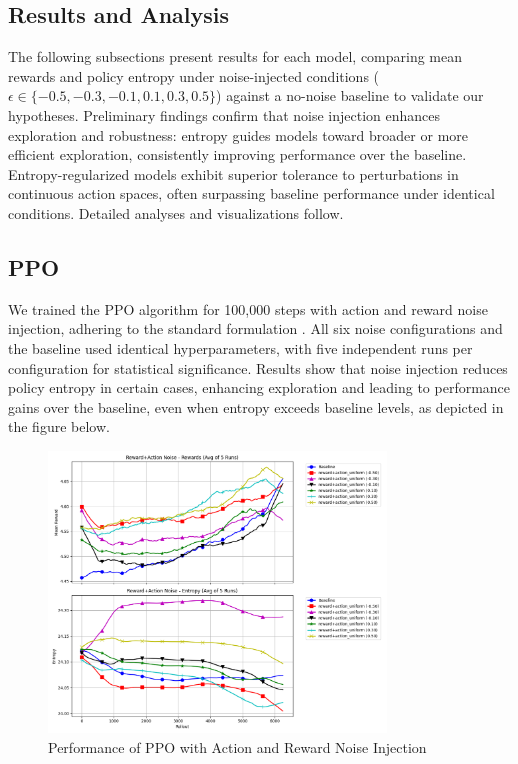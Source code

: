 \documentclass{svproc}
\begin{document}

\subsection{Results and Analysis}

The following subsections present results for each model, comparing mean rewards and policy entropy under noise-injected conditions (\(\epsilon \in \{-0.5, -0.3, -0.1, 0.1, 0.3, 0.5\}\)) against a no-noise baseline to validate our hypotheses. Preliminary findings confirm that noise injection enhances exploration and robustness: entropy guides models toward broader or more efficient exploration, consistently improving performance over the baseline. Entropy-regularized models exhibit superior tolerance to perturbations in continuous action spaces, often surpassing baseline performance under identical conditions. Detailed analyses and visualizations follow.

\subsection{PPO}

We trained the PPO algorithm for 100,000 steps with action and reward noise injection, adhering to the standard formulation \cite{schulman2017proximalpolicyoptimizationalgorithms}. All six noise configurations and the baseline used identical hyperparameters, with five independent runs per configuration for statistical significance. Results show that noise injection reduces policy entropy in certain cases, enhancing exploration and leading to performance gains over the baseline, even when entropy exceeds baseline levels, as depicted in the figure below.

\vspace*{-\baselineskip}
\begin{figure}[H]
    \centering
    \includegraphics[width=0.8\textwidth]{.assets/PPO_100000_reward_action_5_runs_resmoothed.png}
    \caption{Performance of PPO with Action and Reward Noise Injection}
\end{figure}
\vspace*{-\baselineskip}
\end{document}
